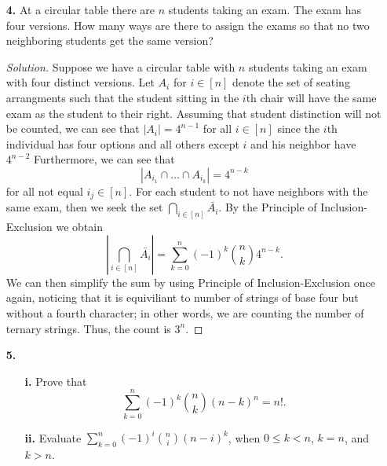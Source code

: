 \documentclass[ 12pt ]{article}
\begin{document}
\begin{enumerate}
\begin{proof}[Solution]
\begin{enumerate}
				\item[\textbf{ii.}] Suppose the professors were assigned courses in the Fall and they were to be assigned courses again in the Spring. Let $A_i$ for $i \in [n]$ denote
					the set of course assignments such that the $i$th professor teaches the same courses. Clearly we can see that $$|A_{i_1} \cap \hdots \cap A_{i_k}| =
					\frac{(2n - 2k)!}{2^{n-k}}$$ for all not equal $i_j \in [n]$ since we are not arranging the $k$ specified professors' classes. For each professor to teach
					different courses we seek the set $\bigcap_{i \in [n]} \bar{A_i}$. By the Principle of Inclusion-Exclusion we obtain $$\left | \bigcap_{i \in [n]} \bar{A_i} \right |
					= \sum_{k = 0}^n (-1)^k \binom{n}{k} \frac{(2n - 2k)!}{2^{n - k}}.$$
			\end{enumerate}
		\end{proof}


	\item[\textbf{4.}] At a circular table there are $n$ students taking an exam. The exam has four versions. How many ways are there to assign the exams so that no two neighboring
		students get the same version?

		\begin{proof}[Solution]
			Suppose we have a circular table with $n$ students taking an exam with four distinct versions. Let $A_i$ for $i \in [n]$ denote the set of seating arrangments such that the
			student sitting in the $i$th chair will have the same exam as the student to their right. Assuming that student distinction will not be counted, we can see that $|A_i| =
			4^{n - 1}$ for all $i \in [n]$ since the $i$th individual has four options and all others except $i$ and his neighbor have $4^{n-2}$ Furthermore, we can see that
			$$|A_{i_1} \cap \hdots \cap A_{i_k}| = 4^{n - k}$$ for all not equal $i_j \in [n]$. For each student to not have neighbors with the same exam, then we seek the
			set $\bigcap_{i \in [n]} \bar{A_i}$. By the Principle of Inclusion-Exclusion we obtain $$\left | \bigcap_{i \in [n]} \bar{A_i} \right | = \sum_{k = 0}^n (-1)^k \binom{n}{k}
			4^{n - k}.$$ We can then simplify the sum by using Principle of Inclusion-Exclusion once again, noticing that it is equiviliant to number of strings of base four but without
			a fourth character; in other words, we are counting the number of ternary strings. Thus, the count is $3^n$.
		\end{proof}


	\item[\textbf{5.}]
		\begin{enumerate}
			\item[\textbf{i.}] Prove that $$\sum_{k = 0}^n (-1)^k \binom{n}{k}(n-k)^n = n!.$$
			\item[\textbf{ii.}] Evaluate $\sum_{k = 0}^n (-1)^i \binom{n}{i}(n-i)^k$, when $0 \leq k < n$, $k = n$, and $k > n$.
		\end{enumerate}


\end{enumerate}
\end{document}
